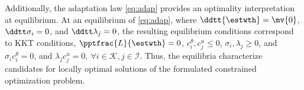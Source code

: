 \documentclass[letterpaper, journal]{IEEEtran}
\begin{document}
Additionally, the adaptation law \eqref{eq:adap} provides an optimality interpretation at equilibrium.
At an equilibrium of \eqref{eq:adap}, where $\ddtt{\estwth}=\mv{0}$, $\ddtt\sigma_i=0$, and $\ddtt\lambda_j=0$, the resulting equilibrium conditions correspond to KKT conditions, \ie $\pptfrac{L}{\estwth}=0$, $c^{\theta}_i,c^{u}_j \le 0$, $\sigma_i,\lambda_j \ge 0$, and $\sigma_i c^{\theta}_i=0$, and $\lambda_j c^{u}_j=0,\ \forall i\in\mathcal{K},j\in\mathcal{I}$.
Thus, the equilibria characterize candidates for locally optimal solutions of the formulated constrained optimization problem.



\end{document}
